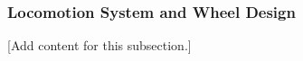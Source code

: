 
\subsubsection{Locomotion System and Wheel Design}
\label{subsubsec:design_2_1_2_locomotion_wheel_design}

[Add content for this subsection.]
